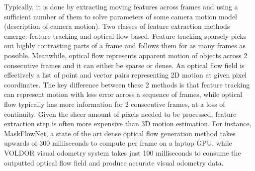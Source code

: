 \documentclass[11pt,english]{report}
\begin{document}
Typically, it is done by extracting moving features across frames and using a sufficient number of them to solve parameters of some camera motion model (description of camera motion). Two classes of feature extraction methods emerge: feature tracking and optical flow based. Feature tracking sparsely picks out highly contrasting parts of a frame and follows them for as many frames as possible. Meanwhile, optical flow represents apparent motion of objects across 2 consecutive frames and it can either be sparse or dense. An optical flow field is effectively a list of point and vector pairs representing 2D motion at given pixel coordinates. The key difference between these 2 methods is that feature tracking can represent motion with less error across a sequence of frames, while optical flow typically has more information for 2 consecutive frames, at a loss of continuity. Given the sheer amount of pixels needed to be processed, feature extraction step is often more expensive than 3D motion estimation. For instance, MaskFlowNet\cite{zhao2020maskflownet}, a state of the art dense optical flow generation method takes upwards of 300 milliseconds to compute per frame on a laptop GPU, while VOLDOR\cite{voldor} visual odometry system takes just 100 milliseconds to consume the outputted optical flow field and produce accurate visual odometry data.
\end{document}
